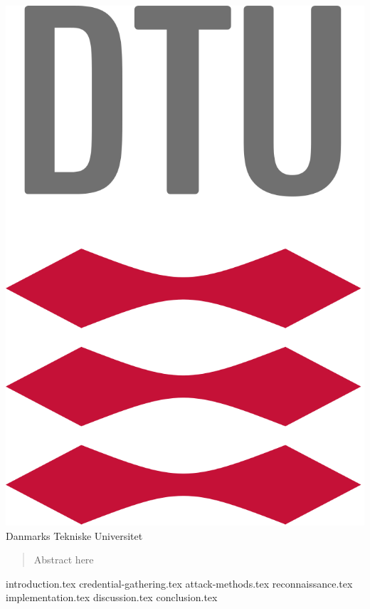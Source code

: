 \documentclass{article}
\begin{document}
\maketitle
\begin{center}
	\vspace{1cm}
	\includegraphics[scale=0.2]{dtulogo}\\
	\LARGE
	Danmarks Tekniske Universitet\\
\end{center}
\newpage


\begin{abstract}
    Abstract here
\end{abstract}
\newpage

\tableofcontents
\newpage

{introduction.tex}
{credential-gathering.tex}
{attack-methods.tex}
{reconnaissance.tex}
{implementation.tex}
{discussion.tex}
{conclusion.tex}

\BackMatter
\end{document}

